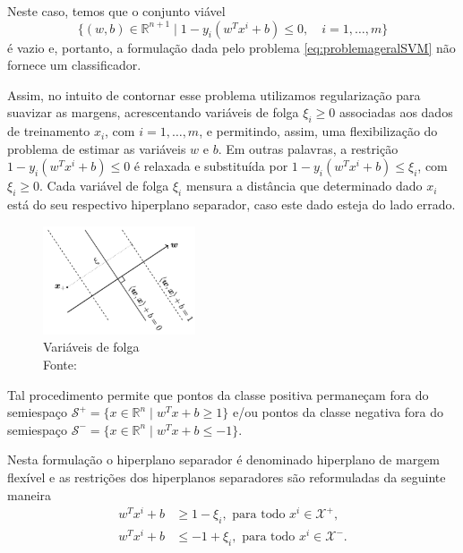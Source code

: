 \documentclass[12pt,a4paper]{scrartcl}
\def\Xset{\mathcal{X}}
\def\RR{\mathds{R}}
\theoremstyle{definition}%
\begin{document}
Neste caso, temos que o conjunto viável
\[
\{ (w,b) \in \RR^{n+1} \mid 1-y_{i}(w^{T}x^{i} + b) \leq 0 , \quad i=1, \ldots , m \}
\]
é vazio e, portanto, a formulação dada pelo problema \eqref{eq:problemageralSVM} não fornece um classificador.

Assim, no intuito de contornar esse problema utilizamos regularização para suavizar as margens, acrescentando variáveis de folga $\xi_{i} \geq 0$ associadas aos dados de treinamento $x_{i}$, com $i=1, \ldots , m$, e permitindo, assim, uma flexibilização do problema de estimar as variáveis $w$ e $b$. Em outras palavras, a restrição $1-y_{i}(w^{T}x^{i} + b) \leq 0$ é relaxada e substituída por $1-y_{i}(w^{T}x^{i} + b) \leq \xi_{i} $, com $\xi_{i} \geq 0$. Cada variável de folga $\xi_{i}$ mensura a distância que determinado dado $x_{i}$ está do seu respectivo hiperplano separador, caso este dado esteja do lado errado.

\begin{figure}[!h] 
	\centering
	\includegraphics[width=0.40\textwidth]{mmlinterpretacao_variavel_xi}
	\caption{Variáveis de folga \label{fig5} \\ Fonte: \textcite{Faisal2019}}
\end{figure}

Tal procedimento permite que pontos da classe positiva permaneçam fora do semiespaço $\mathcal{S}^{+}=\{x\in \RR^n \mid w^{T}x+b\geq 1\}$ e/ou pontos da classe negativa fora do semiespaço $\mathcal{S}^{-}=\{x\in \RR^n \mid w^{T}x+b\leq -1\}$. 

Nesta formulação o hiperplano separador é denominado hiperplano de margem flexível e as restrições dos hiperplanos separadores são reformuladas da seguinte maneira 
\begin{align}
w^{T}x^{i}+b &\geq 1 - \xi_{i} , \text{ para  todo } x^{i} \in \Xset^{+}, \label{restricoesCSVM+} \\
w^{T}x^{i}+b &\leq -1 +\xi_{i} , \text{ para  todo } x^{i} \in \Xset^{-}. \label{restricoesCSVM-}
\end{align}
\end{document}
